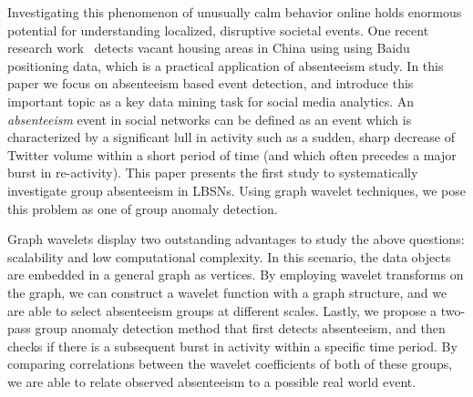 Investigating this phenomenon of unusually calm behavior online holds enormous potential for understanding localized, disruptive societal events. One recent research work~\cite{chi2015ghost} detects vacant housing areas in China using using Baidu positioning data, which is a practical application of absenteeism study. In this paper we focus on absenteeism based event detection, and introduce this important topic as a key data mining task for social media analytics.
An \textit{absenteeism} event in social networks can be defined as an event which is characterized by a significant lull in activity such as a sudden, sharp decrease of Twitter volume within a short period of time (and which  often precedes a major burst in re-activity).
This paper presents the first study to systematically investigate group absenteeism in LBSNs.
Using graph wavelet techniques, we pose this problem as one of group anomaly detection.
%
%

Graph wavelets display two outstanding advantages to study the above
questions: scalability and low computational complexity.
In this scenario, the data objects are embedded in a general graph as vertices.
By employing wavelet transforms on the graph, we can construct a wavelet function with a graph structure, and we are able to select absenteeism groups at different scales.
Lastly, we propose a two-pass group anomaly detection method that first detects absenteeism, and then checks if there is a subsequent burst in activity within a specific time period.
By comparing correlations between the wavelet coefficients of both of these groups, we are able to relate observed absenteeism to a possible real world event.


